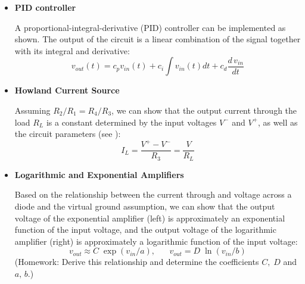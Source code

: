 \documentclass{article}
\begin{document}
\begin{itemize}
\item {\bf PID controller}

  A proportional-integral-derivative (PID) controller can be implemented
  as shown. The output of the circuit is a linear combination of the
  signal together with its integral and derivative:
  \begin{equation}
  v_{out}(t)=c_p v_{in}(t)+c_i \int v_{in}(t) dt +c_d\frac{d\,v_{in}}{dt}
  \end{equation}


\item {\bf Howland Current Source}


  Assuming $R_2/R_1=R_4/R_3$, we can show that the output current
  through the load $R_L$ is a constant determined by the input
  voltages $V^-$ and $V^+$, as well as the circuit parameters
  (see ):
  \begin{equation}
  I_L=\frac{V^+-V^-}{R_3}=\frac{V}{R_L}
  \end{equation}

  \begin{comment}
  \begin{equation}
  \frac{V^--V}{R_1}+\frac{V_0-V}{R_2}=0,\;\;\;\;\;\;
  \frac{V^+-V}{R_3}+\frac{V_0-V}{R_4}=\frac{V}{R_L};
  \end{equation}
  Solving the first equation for $V_0-V$:
  \begin{equation}
  V_0-V=(V-V^-)\frac{R_2}{R_1}=(V-V^-)\frac{R_4}{R_3}
  \end{equation}
  and substituting into the second equation, we get:
  \begin{equation}
  \frac{V^+-V}{R_3}+\frac{V-V^-}{R_3}
  =\frac{V^+-V^-}{R_3}=\frac{V}{R_L}=I_L
  \end{equation}
  We see that the current through the load resistor $R_L$
  is constant, independent of $R_L$, i.e., the circuit is
  a current source.
  \end{comment}

\item {\bf Logarithmic and Exponential Amplifiers}


  Based on the relationship between the current through and voltage 
  across a diode and the virtual ground assumption, we can show 
  that the output voltage of the exponential amplifier (left) is
  approximately an exponential function of the input voltage, and 
  the output voltage of the logarithmic amplifier (right) is 
  approximately a logarithmic function of the input voltage:
  \begin{equation}
  v_{out}\approx C \;\exp(v_{in}/a),\;\;\;\;\;\; v_{out}= D\; \ln (v_{in}/b)
  \end{equation}
  (Homework: Derive this relationship and determine the coefficients 
  $C,\;D$ and $a,\,b$.)


\end{itemize}
\end{document}
